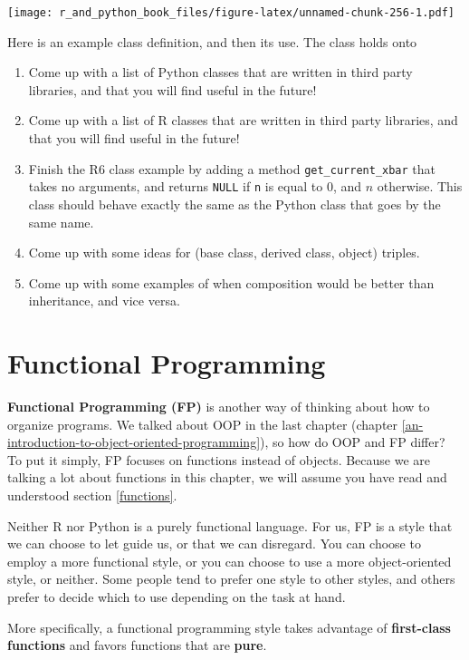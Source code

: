 \documentclass[
  12pt,
  krantz2]{krantz}
\begin{document}
\texttt{[image: r\_and\_python\_book\_files/figure-latex/unnamed-chunk-256-1.pdf]}

Here is an example class definition, and then its use. The class holds onto

\begin{enumerate}
\def\labelenumi{\arabic{enumi}.}
\setcounter{enumi}{2}
\item
  Come up with a list of Python classes that are written in third party libraries, and that you will find useful in the future!
\item
  Come up with a list of R classes that are written in third party libraries, and that you will find useful in the future!
\item
  Finish the R6 class example by adding a method \texttt{get\_current\_xbar} that takes no arguments, and returns \texttt{NULL} if \texttt{n} is equal to \(0\), and \(n\) otherwise. This class should behave exactly the same as the Python class that goes by the same name.
\item
  Come up with some ideas for (base class, derived class, object) triples.
\item
  Come up with some examples of when composition would be better than inheritance, and vice versa.
\end{enumerate}

\hypertarget{functional-programming}{%
\chapter{Functional Programming}\label{functional-programming}}

\textbf{Functional Programming (FP)} is another way of thinking about how to organize programs. We talked about OOP in the last chapter (chapter \ref{an-introduction-to-object-oriented-programming}), so how do OOP and FP differ? To put it simply, FP focuses on functions instead of objects. Because we are talking a lot about functions in this chapter, we will assume you have read and understood section \ref{functions}.

Neither R nor Python is a purely functional language. For us, FP is a style that we can choose to let guide us, or that we can disregard. You can choose to employ a more functional style, or you can choose to use a more object-oriented style, or neither. Some people tend to prefer one style to other styles, and others prefer to decide which to use depending on the task at hand.

More specifically, a functional programming style takes advantage of \textbf{first-class functions} and favors functions that are \textbf{pure}.
\end{document}
